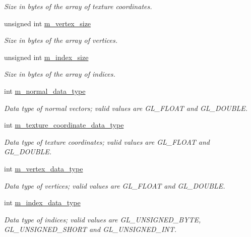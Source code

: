 \begin{DoxyCompactItemize}
\begin{DoxyCompactList}\small\item\em Size in bytes of the array of texture coordinates. \end{DoxyCompactList}\item 
unsigned int \hyperlink{class_graphics_1_1_v_b_o_a22a4fa87cd40138f131e8dc3e604053c}{m\_\-vertex\_\-size}
\begin{DoxyCompactList}\small\item\em Size in bytes of the array of vertices. \end{DoxyCompactList}\item 
unsigned int \hyperlink{class_graphics_1_1_v_b_o_a6aee1be4b03097c901914f138cfb70d2}{m\_\-index\_\-size}
\begin{DoxyCompactList}\small\item\em Size in bytes of the array of indices. \end{DoxyCompactList}\item 
int \hyperlink{class_graphics_1_1_v_b_o_acc73a624adcb5819c83fdee509032dc8}{m\_\-normal\_\-data\_\-type}
\begin{DoxyCompactList}\small\item\em Data type of normal vectors; valid values are GL\_\-FLOAT and GL\_\-DOUBLE. \end{DoxyCompactList}\item 
int \hyperlink{class_graphics_1_1_v_b_o_a450479bb177f1b603baab9e809f8a3fe}{m\_\-texture\_\-coordinate\_\-data\_\-type}
\begin{DoxyCompactList}\small\item\em Data type of texture coordinates; valid values are GL\_\-FLOAT and GL\_\-DOUBLE. \end{DoxyCompactList}\item 
int \hyperlink{class_graphics_1_1_v_b_o_a5c41a622ac8a3b1a2798d8fa69d53db6}{m\_\-vertex\_\-data\_\-type}
\begin{DoxyCompactList}\small\item\em Data type of vertices; valid values are GL\_\-FLOAT and GL\_\-DOUBLE. \end{DoxyCompactList}\item 
int \hyperlink{class_graphics_1_1_v_b_o_a87e3330b9c688d6981c1b23fcfeab9a5}{m\_\-index\_\-data\_\-type}
\begin{DoxyCompactList}\small\item\em Data type of indices; valid values are GL\_\-UNSIGNED\_\-BYTE, GL\_\-UNSIGNED\_\-SHORT and GL\_\-UNSIGNED\_\-INT. \end{DoxyCompactList}\item 

\end{DoxyCompactItemize}
